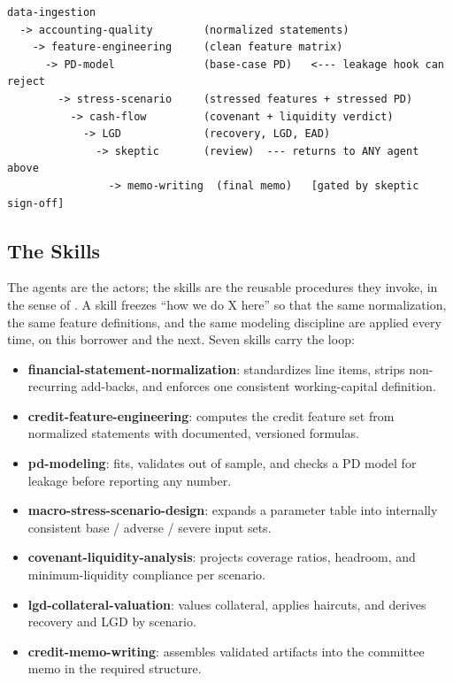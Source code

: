 \begin{listing}[t]
\begin{verbatim}
data-ingestion
  -> accounting-quality        (normalized statements)
    -> feature-engineering     (clean feature matrix)
      -> PD-model              (base-case PD)   <--- leakage hook can reject
        -> stress-scenario     (stressed features + stressed PD)
          -> cash-flow         (covenant + liquidity verdict)
            -> LGD             (recovery, LGD, EAD)
              -> skeptic       (review)  --- returns to ANY agent above
                -> memo-writing  (final memo)   [gated by skeptic sign-off]
\end{verbatim}
\caption{The Meridian agent pipeline. Solid edges carry validated artifacts
forward; the skeptic and the hooks supply the backward edges that turn the pipeline
into an iteration loop.}
\label{lst:agent-pipeline}
\end{listing}

\subsection{The Skills}\label{subsec:credit-skills}

The agents are the actors; the skills are the reusable procedures they invoke, in
the sense of . A skill freezes ``how we do X here''
so that the same normalization, the same feature definitions, and the same modeling
discipline are applied every time, on this borrower and the next. Seven skills
carry the loop:

\begin{itemize}
\item \textbf{financial-statement-normalization}: standardizes line items,
strips non-recurring add-backs, and enforces one consistent working-capital
definition.
\item \textbf{credit-feature-engineering}: computes the credit feature set from
normalized statements with documented, versioned formulas.
\item \textbf{pd-modeling}: fits, validates out of sample, and checks a PD model
for leakage before reporting any number.
\item \textbf{macro-stress-scenario-design}: expands a parameter table into
internally consistent base / adverse / severe input sets.
\item \textbf{covenant-liquidity-analysis}: projects coverage ratios, headroom,
and minimum-liquidity compliance per scenario.
\item \textbf{lgd-collateral-valuation}: values collateral, applies haircuts,
and derives recovery and LGD by scenario.
\item \textbf{credit-memo-writing}: assembles validated artifacts into the
committee memo in the required structure.
\end{itemize}

